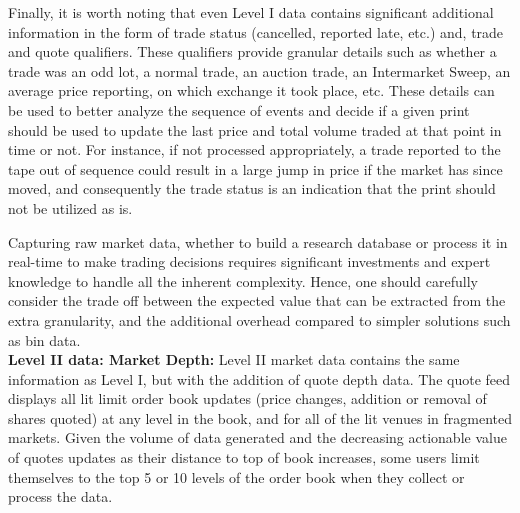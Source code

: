 Finally, it is worth noting that even Level I data contains significant additional information in the form of trade status (cancelled, reported late, etc.) and, trade and quote qualifiers. These qualifiers provide granular details such as whether a trade was an odd lot, a normal trade, an auction trade, an Intermarket Sweep, an average price reporting, on which exchange it took place, etc. These details can be used to better analyze the sequence of events and decide if a given print should be used to update the last price and total volume traded at that point in time or not. For instance, if not processed appropriately, a trade reported to the tape out of sequence could result in a large jump in price if the market has since moved, and consequently the trade status is an indication that the print should not be utilized as is.


Capturing raw market data, whether to build a research database or process it in real-time to make trading decisions requires significant investments and expert knowledge to handle all the inherent complexity. Hence, one should carefully consider the trade off between the expected value that can be extracted from the extra granularity, and the additional overhead compared to simpler solutions such as bin data.\\


\noindent\textbf{Level II data: Market Depth:}  Level II market data contains the same information as Level I, but with the addition of quote depth data. The quote feed displays all lit limit order book updates (price changes, addition or removal of shares quoted) at any level in the book, and for all of the lit venues in fragmented markets. Given the volume of data generated and the decreasing actionable value of quotes updates as their distance to top of book increases, some users limit themselves to the top 5 or 10 levels of the order book  when they collect or process the data.\\


